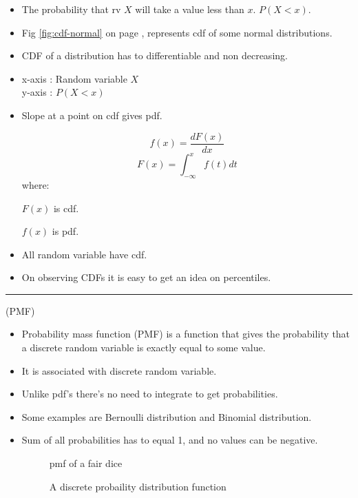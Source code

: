 \documentclass[	DIV=calc,%
paper=a4,%
fontsize=11pt,%
twocolumn]{scrartcl} %
\newcommand{\hformbar}[1]{\vspace{5pt}\hrule\vspace{10pt}} %
\newcommand{\formdesc}[1]{\noindent\textbf{#1}}
\begin{document}
\begin{itemize}
	\item The probability that rv $X$ will take a value less than $x$. $P(X<x)$.
	\item Fig \ref{fig:cdf-normal} on page \pageref{fig:cdf-normal}, represents cdf of some normal distributions.
	\item CDF of a distribution has to differentiable and non decreasing.
	\item x-axis : Random variable $X$ \\ y-axis : $P(X<x)$
	\item Slope at a point on cdf gives pdf.
	
	\begin{equation}
		f(x)=\frac{dF(x)}{dx}
	\end{equation}
	\begin{equation}
		F(x)=\int_{-\infty}^{x}f(t) dt
	\end{equation}
where:

	$F(x)$ is cdf.
	
	$f(x)$ is pdf.
	
	\item All random variable have cdf.
	\item  On observing CDFs it is easy to get an idea on percentiles.
\end{itemize}

\hformbar
\formdesc{Probability mass function:} (PMF)

\begin{itemize}
	\item Probability mass function (PMF) is a function that gives the probability that a discrete random variable is exactly equal to some value.
	\item It is associated with discrete random variable.
	\item Unlike pdf's there's no need to integrate to get probabilities.
	\item Some examples are Bernoulli distribution and Binomial distribution.
	\item Sum of all probabilities has to equal 1, and no values can be negative. 
	\begin{figure}[ht!]
		\centering
		\caption{pmf of a fair dice}
		\graphicspath{ {images/math/} }
		
	\end{figure}
	
	\begin{figure}[ht!]
		\centering
		\caption{A discrete probaility distribution function}
		\graphicspath{ {images/math/} }
		
	\end{figure}

\end{itemize}
\end{document}

